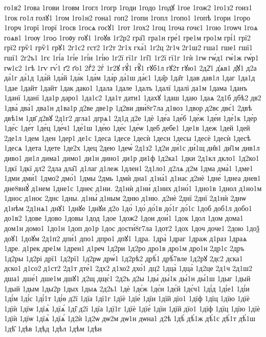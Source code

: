 {го1в2
1гова
1гови
1говм
1гогл
1гогр
1годи
1годо
1годꙋ
1гое
1гож2
1го1з2
гоиз1
1гок
го1л
голꙋ1
1гом
1го1н2
гона1
гоп2
1гопи
1гопл
1гопо1
1гопѣ
1гори
1горо
1горч
1горї
1горї
1госв
1госѧ
госꙋ1
1гот
1гох2
1гоц
1гоча
гочє1
1гою
1гоѡч
1гоѧ
гоѧв1
1гоѹ
1гоѻ
1гоᲂу
гоꙋ1
1гоꙋв
1г2р2
гра̑1
гра1н
гре́1
гре1м
гро1м
грі́1
грї2
грї2
грѷ1
грѷ1
грꙋ1
2г1с2
гст2
1г2т
2г1х
гха́1
1г2ц
2г1ч
2г1ш2
гша1
гше1
гшї1
гшї1
2г2ъ1
1гє
1гі́а
1гі́е
1гі́и
1гі́ю
1г2ї
гї1г
1гі̑1
1г2ї
гї1г
1гѝ
1гѡ
гѡ́д1
гѡ́1ж
гѡ́р1
гѡ1с2
1гѣ
1гѵ
гѵ́1
г҃2
г҃о1
2гⷣ2
2гⷭ
1г2ꙋ
гꙋ́1
гꙋ̑1
гꙋб1л
гꙋ2т
гꙋю1
2д2̾1
д̾ѧв1
д̾ꙋ1
д2а
да́1г
да́1д
1да́й
1да́й
1да́к
1да́м
1да́р
да́1ш
да́є1
1да̑р
1да̑т
1дав
дав1л
1даг
1да1д
1дае
1дайт
1дайт
1дак
дако1
1дала
1дале
1далъ
1далї
1далї
да1м
1дама
1данъ
1данї
1данї
1да1р
даро1
1да1с2
1да1т
дати1
1дахꙋ
1даш
1даю
1даѧ
2д1б
дбѣ2
дв2
1два̀
два́1
два1н
д1ва1р
д2ве
две1р
1д2ви
дви́8г7ла
д1воз
1двор
д2вє
двє́1
2двѣ
двѣ1м
1дв҃
д2вꙋ
2д1г2
дгла1
дгрѧ1
2д1д
д2е
1дѐ
1де́а
1де́б
1де́ж
1де́и
1де́1к
1де́р
1де́с
1де́т
1де́ц
1де́ч1
1де́1ш
1де́ю
1де́є
1де́ѡ
1деб
дебе1
1де1в
1деж
1дей
1дей
2де1л
1дем
1ден
1дер1
де1с
1деса
1десе
1десѝ
1десн
1десы
1десѐ
1десѝ
1десѣ
1десѧ
1дета
1дете
1де2х
1дец
2дею
1деѡ́
2д1з2
1д2и
ди́1с
ди́1щ
ди̑в1
ди̑1м
див1л
диво1
ди1л
дима1
димо1
ди1н
дино1
ди1р
ди1ф
1д2ка1
1дки
2д1кл
дкло1
1д2ко1
1дкї
1дкї
дл2
2дла
дла̑1
д1лаг
д1леж
1длен1
2д1ло1
д2лѧ
д2м
1дма
дма́1
1дме1
1дми
дми́1
1дмо2
дмо́1
1дмы
2дмь
1дмѝ
дна1
д1на́1
д1нас
д2нѐ
1дне́
1днеа
днев1
дне8внꙋ́
д1нем
1дне1с
1днеє
д1ни.
2д1нѝ
д1ни́
д1них
д1но́1
1дно1в
1днол
д1но1м
1днос
д1ноє
2днс
1дны.
д1ны́
д1ным
2дню
д1ню.
д2нѐ
2днї
2днї
2д1нѝ
2днѡ
д1нѣм
2д1нѧ1
днꙋ1
1днꙋе
1днꙋи
д2о
1до̀
1до́
до́1в
до́1г
до́1с
1доб
доб1л
добо1
до1в2
1дове
1дово
1довы
1дод
1дое
1дож2
1дои
дои́1
1док
1дол
1дом
дома1
дом1н
домо1
1до1н
1доп
до1р
1дос
дости́8г7ла
1дот2
1дох
1доч
доче1
2дою
1доѯ
доꙋ1
1доꙋм
2д1п2
дпи́1
дпо1
дпро1
дпꙋ1
1дра.
1дра̀
1драг
1драж
д1раз
1драѧ
1дре.
д1рек
дре1м
1дрен1
д1реч
1д2ри
1д2ро
дро1в
дро1м
дро1н
2др1с
2дръ
1д2ры
1д2рі
дрї1
1д2рї1
1д2рѡ
дрѡ́1
1д2рѣ2
дрѣ́1
дрѣ́7вле
1д2рꙋ
2дс2
дска1
дско1
д1со2
д1ст2
2д1т
дте́1
2дх2
д1хо2
дхо́1
дц2
1дца̀
1дца́
1д2це
2д1ч
2д1ш2
дша1
дше́1
дше1м
дшꙋ1
д2щ
дщє́1
2д2ъ
д2ы
1ды́
ды́1к
ды́1н
ды́1ш
1дыг
1дый
1дый
1дым
1ды2р
1дых
1дыѧ
2д2ь1
1дѐ
1дє́ж
1дє́и
1дє́й
1дє́ч1
1ді́д
1ді́е1
1ді́и
1ді́м
1ді́с
1ді́1т
1ді́ѳ
д2ї
1дїа
1дї1г
1дїѐ
1дїе́
1дїи
1дїй
дїо1
1дїф
1дїц
1дїю
1дїѐ
1дїѝ
1дїѡ
1дїѧ̀
1дїѧ́
1ді̑
д2ї
1дїа
1дї1г
1дїѐ
1дїе́
1дїи
1дїй
дїо1
1дїф
1дїц
1дїю
1дїѐ
1дїѝ
1дїѡ
1дїѧ̀
1дїѧ́
1д2ѝ
1д2ѡ
дѡ2м
дѡ1н
дѡна1
д2ѣ
1дѣ́
дѣ́1ж
дѣ́1с
дѣ́1т
дѣ́1ш
1дѣ̑
1дѣв
1дѣд
1дѣл
1дѣм
1дѣн
}
